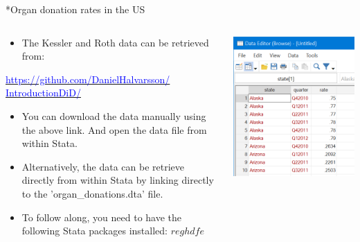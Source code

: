 \documentclass[notes,11pt, aspectratio=169]{beamer}
\begin{document}
\begin{frame}{*Organ donation rates in the US}
\begin{columns}
\begin{column}{0.5\textwidth}
  
\begin{itemize}
    \item The Kessler and Roth data can be retrieved from:
\end{itemize}
\href{https://github.com/DanielHalvarsson/IntroductionDiD/}{\textcolor{blue}{https://github.com/DanielHalvarsson/\\IntroductionDiD/}}
\begin{itemize}
    \item You can download the data manually using the above link. And open the data file from within Stata.
    \item Alternatively, the data can be retrieve directly from within Stata by linking directly to the 'organ\_donations.dta' file.
    \item To follow along, you need to have the following Stata packages installed: $reghdfe$
\end{itemize}
\end{column}
\begin{column}{0.5\textwidth}
 \begin{center}
        \includegraphics[width=0.7\linewidth]{24_DiDLecture/24_DiDLecture_LoadData.png}
    \end{center}
\end{column}
\end{columns}
\end{frame}
\end{document}
